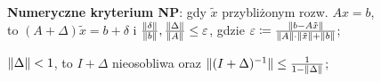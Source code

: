 \entry
\textbf{Numeryczne kryterium NP}:
gdy $\tilde{x}$ przybliżonym rozw. $Ax=b$,\\
to $(A+\Delta)\tilde{x}=b+\delta$
i $\frac{\|\delta\|}{\|b\|}, \frac{\|\Delta\|}{\|A\|} \leq \varepsilon$,
gdzie $\varepsilon \coloneqq \frac{\|b-A\tilde{x}\|}{\|A\| \cdot \|\tilde{x}\| + \|b\| }$;


\entry
$\|\Delta\| < 1$,
to $I + \Delta$ nieosobliwa
oraz $\|(I + \Delta)^{-1}\| \leq \frac{1}{1 - \|\Delta\|}$;
